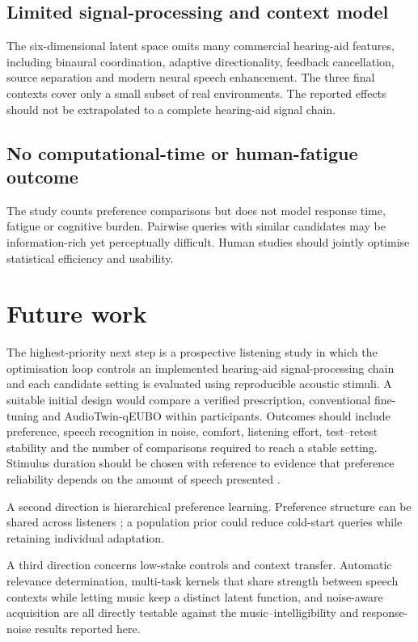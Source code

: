 \documentclass[preprint,12pt]{elsarticle}
\begin{document}
\subsection{Limited signal-processing and context model}

The six-dimensional latent space omits many commercial hearing-aid features, including binaural coordination, adaptive directionality, feedback cancellation, source separation and modern neural speech enhancement. The three final contexts cover only a small subset of real environments. The reported effects should not be extrapolated to a complete hearing-aid signal chain.

\subsection{No computational-time or human-fatigue outcome}

The study counts preference comparisons but does not model response time, fatigue or cognitive burden. Pairwise queries with similar candidates may be information-rich yet perceptually difficult. Human studies should jointly optimise statistical efficiency and usability.

\section{Future work}
\label{sec:future}

The highest-priority next step is a prospective listening study in which the optimisation loop controls an implemented hearing-aid signal-processing chain and each candidate setting is evaluated using reproducible acoustic stimuli. A suitable initial design would compare a verified prescription, conventional fine-tuning and AudioTwin-qEUBO within participants. Outcomes should include preference, speech recognition in noise, comfort, listening effort, test--retest stability and the number of comparisons required to reach a stable setting. Stimulus duration should be chosen with reference to evidence that preference reliability depends on the amount of speech presented \cite{whitmer2022}.

A second direction is hierarchical preference learning. Preference structure can be shared across listeners \cite{birlutiu2010}; a population prior could reduce cold-start queries while retaining individual adaptation.

A third direction concerns low-stake controls and context transfer. Automatic relevance determination, multi-task kernels that share strength between speech contexts while letting music keep a distinct latent function, and noise-aware acquisition are all directly testable against the music--intelligibility and response-noise results reported here.
\end{document}
